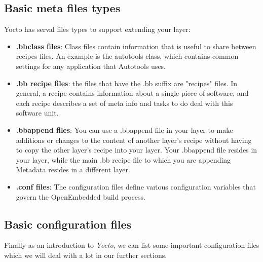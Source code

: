 \documentclass{article}
\begin{document}


\subsection{Basic meta files types}
Yocto has serval files types to support extending your layer:
\begin{itemize}
  \item \textbf{.bbclass files}: Class files contain information that is useful to share between recipes files. An example is the autotools class, which contains common settings for any application that Autotools uses.
  \item \textbf{.bb recipe files}: the files that have the .bb suffix are "recipes" files. In general, a recipe contains information about a single piece of software, and each recipe describes a set of meta info and tasks to do deal with this software unit. 
  \item \textbf{.bbappend files}: You can use a .bbappend file in your layer to make additions or changes to the content of another layer's recipe without having to copy the other layer's recipe into your layer. Your .bbappend file resides in your layer, while the main .bb recipe file to which you are appending Metadata resides in a different layer.
  \item \textbf{.conf files}: The configuration files define various configuration variables that govern the OpenEmbedded build process.
\end{itemize}


\subsection{Basic configuration files}
Finally as an introduction to \textit{Yocto}, we can list some important configuration files which we will deal with a lot in our further sections.
\end{document}
